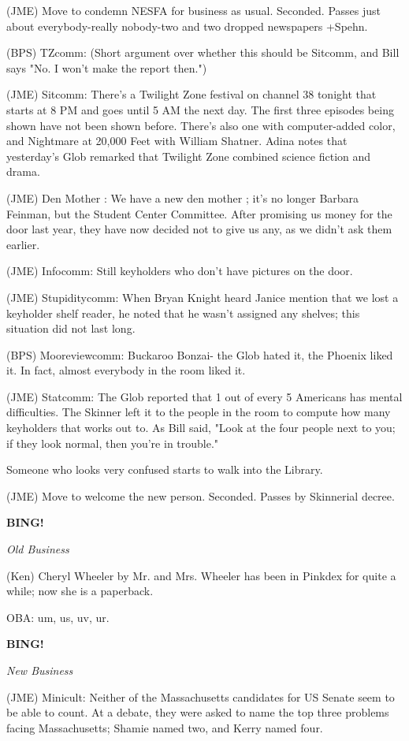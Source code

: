 \documentclass[12pt]{article}
\newcommand{\bing}{{\bf BING!} }
\newcommand{\goto}[1]{\bing \vskip 12pt \centerline{{\em{#1}}}}
\begin{document}
(JME) Move to condemn NESFA for business as usual. Seconded. Passes just about everybody-really nobody-two and two dropped newspapers +Spehn.

(BPS) TZcomm: (Short argument over whether this should be Sitcomm, and Bill says "No. I won't make the report then.")

(JME) Sitcomm: There's a Twilight Zone festival on channel 38 tonight that starts at 8 PM and goes until 5 AM the next day. The first three episodes being shown have not been shown before. There's also one with computer-added color, and Nightmare at 20,000 Feet with William Shatner. Adina notes that yesterday's Glob remarked that Twilight Zone combined science fiction and drama.

(JME) Den Mother      : We have a new den mother      ; it's no longer Barbara Feinman, but the Student Center Committee. After promising us money for the door last year, they have now decided not to give us any, as we didn't ask them earlier.

(JME) Infocomm: Still keyholders who don't have pictures on the door.

(JME) Stupiditycomm: When Bryan Knight heard Janice mention that we lost a keyholder shelf reader, he noted that he wasn't assigned any shelves; this situation did not last long.

(BPS) Mooreviewcomm: Buckaroo Bonzai- the Glob hated it, the Phoenix liked it. In fact, almost everybody in the room liked it.

(JME) Statcomm: The Glob reported that 1 out of every 5 Americans has mental difficulties. The Skinner left it to the people in the room to compute how many keyholders that works out to. As Bill said, "Look at the four people next to you; if they look normal, then you're in trouble."

Someone who looks very confused starts to walk into the Library.

(JME) Move to welcome the new person. Seconded. Passes by Skinnerial decree.

\goto{Old Business}

(Ken) Cheryl Wheeler by Mr. and Mrs. Wheeler has been in Pinkdex for quite a while; now she is a paperback.

OBA: um, us, uv, ur.

\goto{New Business}

(JME) Minicult: Neither of the Massachusetts candidates for US Senate seem to be able to count. At a debate, they were asked to name the top three problems facing Massachusetts; Shamie named two, and Kerry named four.
\end{document}
